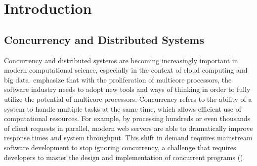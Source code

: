\documentclass{l4proj}
\begin{document}
%
%
%
%
%
%
%
%
\chapter{Introduction}



\section{Concurrency and Distributed Systems}
Concurrency and distributed systems are becoming increasingly important in modern computational science, especially in the context of cloud computing and big data. \cite{sutter_2005_software} emphasize that with the proliferation of multicore processors, the software industry needs to adopt new tools and ways of thinking in order to fully utilize the potential of multicore processors. Concurrency refers to the ability of a system to handle multiple tasks at the same time, which allows efficient use of computational resources. For example, by processing hundreds or even thousands of client requests in parallel, modern web servers are able to dramatically improve response times and system throughput. This shift in demand requires mainstream software development to stop ignoring concurrency, a challenge that requires developers to master the design and implementation of concurrent programs (\cite{sutter_2005_software}).
    
\end{document}
